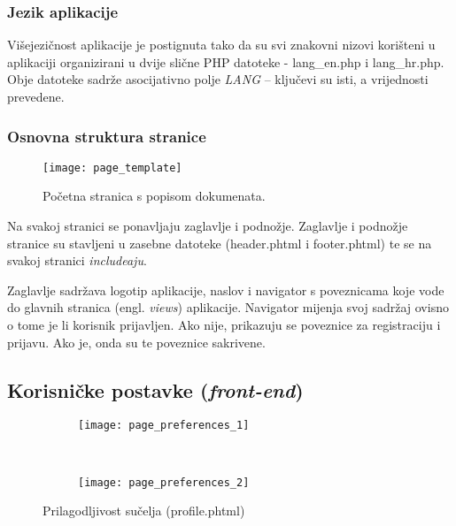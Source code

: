       

      \subsubsection{Jezik aplikacije}

        Višejezičnost aplikacije je postignuta tako da su svi znakovni nizovi
        korišteni u aplikaciji organizirani u dvije slične PHP datoteke -
        lang\_en.php i lang\_hr.php. Obje datoteke sadrže asocijativno polje
        \textit{LANG} -- ključevi su isti, a vrijednosti prevedene.

        

        

    \subsubsection{Osnovna struktura stranice}

    \begin{figure}[h]
      \texttt{[image: page\_template]}
      \caption{Početna stranica s popisom dokumenata.}
    \end{figure}

    Na svakoj stranici se ponavljaju zaglavlje i podnožje. Zaglavlje i podnožje
    stranice su stavljeni u zasebne datoteke (header.phtml i footer.phtml) te se
    na svakoj stranici \textit{includeaju}.

    Zaglavlje sadržava logotip aplikacije, naslov i navigator s poveznicama koje
    vode do glavnih stranica (engl. \textit{views}) aplikacije. Navigator
    mijenja svoj sadržaj ovisno o tome je li korisnik prijavljen. Ako nije,
    prikazuju se poveznice za registraciju i prijavu. Ako je, onda su te
    poveznice sakrivene.

    \subsection{Korisničke postavke (\textit{front-end})}

      \begin{figure}[h]
        \begin{center}
          \begin{subfigure}{0.65\textwidth}
            \texttt{[image: page\_preferences\_1]}
          \end{subfigure}
          \\
          \begin{subfigure}{0.65\textwidth}
            \texttt{[image: page\_preferences\_2]}
          \end{subfigure}

          \caption{Prilagodljivost sučelja (profile.phtml)}
        \end{center}
      \end{figure}


